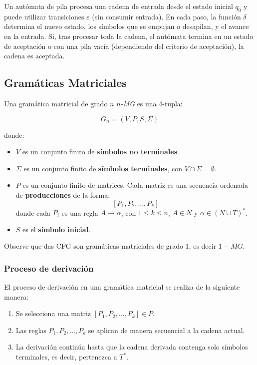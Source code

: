 \documentclass{article}
\begin{document}
Un autómata de pila procesa una cadena de entrada desde el estado inicial $q_0$ y puede utilizar transiciones $\varepsilon$ (sin consumir entrada). En cada paso, la función $\delta$ determina el nuevo estado, los símbolos que se empujan o desapilan, y el avance en la entrada. Si, tras procesar toda la cadena, el autómata termina en un estado de aceptación o con una pila vacía (dependiendo del criterio de aceptación), la cadena es aceptada.


\subsection{Gramáticas Matriciales}

Una gramática matricial \cite{simpleMatrixLanguages} de grado $n$ \textit{$n$-MG} es una 4-tupla:

\[
      G_n = (V, P, S,\Sigma)
\]

donde:
\begin{itemize}
      \item \( V \) es un conjunto finito de \textbf{símbolos no terminales}.
      \item \( \Sigma \) es un conjunto finito de \textbf{símbolos terminales}, con \( V \cap \Sigma = \emptyset \).
      \item \( P \) es un conjunto finito de matrices. Cada matriz es una secuencia ordenada de \textbf{producciones} de la forma:
            \[
                  [P_1, P_2, \dots, P_k]
            \]
            donde cada \( P_i \) es una regla \( A \to \alpha \), con $1\leq k\leq n$, \( A \in N \) y \( \alpha \in (N \cup T)^* \).
      \item \( S  \) es el \textbf{símbolo inicial}.
\end{itemize}

Observe que das CFG son gramáticas matriciales de grado 1, es decir $1-MG$.

\subsubsection{Proceso de derivación}

El proceso de derivación en una gramática matricial se realiza de la siguiente manera:
\begin{enumerate}
      \item Se selecciona una matriz \( [P_1, P_2, \dots, P_k] \in P \).
      \item Las reglas \( P_1, P_2, \dots, P_k \) se aplican de manera secuencial a la cadena actual.
      \item La derivación continúa hasta que la cadena derivada contenga solo símbolos terminales, es decir, pertenezca a \( T^* \).
\end{enumerate}
\end{document}

